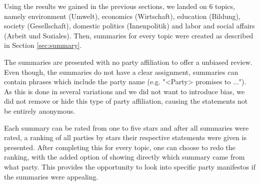 Using the results we gained in the previous sections, we landed on 6 topics, namely environment (Umwelt), economics (Wirtschaft), education (Bildung), society (Gesellschaft), domestic politics (Innenpolitik) and labor and social affairs (Arbeit und Soziales). Then, summaries for every topic were created as described in Section \ref{sec:summary}.

The summaries are presented with no party affiliation to offer a unbiased review. 
Even though, the summaries do not have a clear assignment, summaries can contain phrases which include the party name (e.g. "<Party> promises to ..."). As this is done in several variations and we did not want to introduce bias, we did not remove or hide this type of party affiliation, causing the statements not be entirely anonymous.

Each summary can be rated from one to five stars and after all summaries were rated, a ranking of all parties by stars their respective statements were given is presented.
After completing this for every topic, one can choose to redo the ranking, with the added option of showing directly which summary came from what party. This provides the opportunity to look into specific party manifestos if the summaries were appealing.